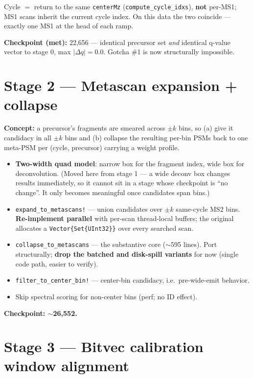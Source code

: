\documentclass[11pt]{article}
\newcommand{\code}[1]{\texttt{\small #1}}
\begin{document}
Cycle $=$ return to the same \code{centerMz} (\code{compute\_cycle\_idxs}), \textbf{not} per-MS1;
MS1 scans inherit the current cycle index. On this data the two coincide --- exactly one MS1 at
the head of each ramp.

\textbf{Checkpoint (met):} 22,656 --- identical precursor set \emph{and} identical q-value vector
to stage 0, max $|\Delta q| = 0.0$. Gotcha \#1 is now structurally impossible.

\section{Stage 2 --- Metascan expansion + collapse}

\textbf{Concept:} a precursor's fragments are smeared across $\pm k$ bins, so (a) give it
candidacy in all $\pm k$ bins and (b) collapse the resulting per-bin PSMs back to one meta-PSM per
(cycle, precursor) carrying a weight profile.

\begin{itemize}[leftmargin=*,itemsep=0.2em]
  \item \textbf{Two-width quad model}: narrow box for the fragment index, wide box for
        deconvolution. (Moved here from stage 1 --- a wide deconv box changes results
        immediately, so it cannot sit in a stage whose checkpoint is ``no change''. It only
        becomes meaningful once candidates span bins.)
  \item \code{expand\_to\_metascans!} --- union candidates over $\pm k$ same-cycle MS2 bins.
        \textbf{Re-implement parallel} with per-scan thread-local buffers; the original allocates
        a \code{Vector\{Set\{UInt32\}\}} over every searched scan.
  \item \code{collapse\_to\_metascans} --- the substantive core ($\sim$595 lines). Port
        structurally; \textbf{drop the batched and disk-spill variants} for now (single code path,
        easier to verify).
  \item \code{filter\_to\_center\_bin!} --- center-bin candidacy, i.e.\ pre-wide-emit behavior.
  \item Skip spectral scoring for non-center bins (perf; no ID effect).
\end{itemize}

\textbf{Checkpoint: $\sim$26,552.}

\section{Stage 3 --- Bitvec calibration window alignment}
\end{document}

